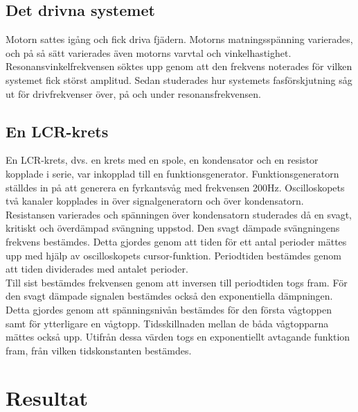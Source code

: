 \documentclass[a4paper,10pt]{article}
\begin{document}
\subsection{Det drivna systemet}
Motorn sattes igång och fick driva fjädern. Motorns matningsspänning varierades, och på så sätt varierades även motorns varvtal och vinkelhastighet. Resonansvinkelfrekvensen söktes upp genom att den frekvens noterades för vilken systemet fick störst amplitud. Sedan studerades hur systemets fasförskjutning såg ut för drivfrekvenser över, på och under resonansfrekvensen.

\subsection{En LCR-krets}
En LCR-krets, dvs. en krets med en spole, en kondensator och en resistor kopplade i serie, var inkopplad till en funktionsgenerator. Funktionsgeneratorn ställdes in på att generera en fyrkantsvåg med frekvensen 200Hz. Oscilloskopets två kanaler kopplades in över signalgeneratorn och över kondensatorn.\\
\indent Resistansen varierades och spänningen över kondensatorn studerades då en svagt, kritiskt och överdämpad svängning uppstod. Den svagt dämpade svängningens frekvens bestämdes. Detta gjordes genom att tiden för ett antal perioder mättes upp med hjälp av oscilloskopets cursor-funktion. Periodtiden bestämdes genom att tiden dividerades med antalet perioder.\\
\indent Till sist bestämdes frekvensen genom att inversen till periodtiden togs fram. För den svagt dämpade signalen bestämdes också den exponentiella dämpningen. Detta gjordes genom att spänningsnivån bestämdes för den första vågtoppen samt för ytterligare en vågtopp. Tidsskillnaden mellan de båda vågtopparna mättes också upp. Utifrån dessa värden togs en exponentiellt avtagande funktion fram, från vilken tidskonstanten bestämdes.

\section{Resultat}
\end{document}
